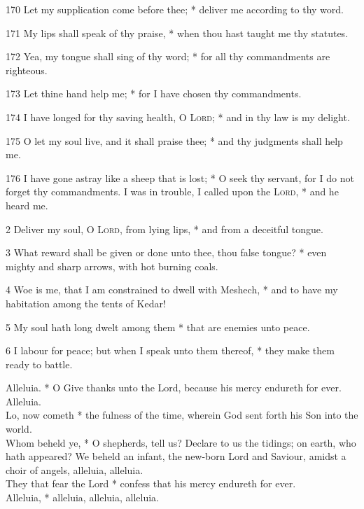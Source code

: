 \par
    170 Let my supplication come before thee; * deliver me according to thy word.
\par
    171 My lips shall speak of thy praise, * when thou hast taught me thy statutes.
\par
    172 Yea, my tongue shall sing of thy word; * for all thy commandments are righteous.
\par
    173 Let thine hand help me; * for I have chosen thy commandments.
\par
    174 I have longed for thy saving health, O \textsc{Lord}; * and in thy law is my delight.
\par
    175 O let my soul live, and it shall praise thee; * and thy judgments shall help me.
\par
    176 I have gone astray like a sheep that is lost; * O seek thy servant, for I do not forget thy commandments. 
 I was in trouble, I called upon the \textsc{Lord}, * and he heard me.
\par
    2 Deliver my soul, O \textsc{Lord}, from lying lips, * and from a deceitful tongue.
\par
    3 What reward shall be given or done unto thee, thou false tongue? * even mighty and sharp arrows, with hot burning coals.
\par
    4 Woe is me, that I am constrained to dwell with Meshech, * and to have my habitation among the tents of Kedar!
\par
    5 My soul hath long dwelt among them * that are enemies unto peace.
\par
    6 I labour for peace; but when I speak unto them thereof, * they make them ready to battle.\\
\par\noindent
{} Alleluia. * O Give thanks unto the Lord, because his mercy endureth for ever. Alleluia.\\
 Lo, now cometh * the fulness of the time, wherein God sent forth his Son into the world.\\
 Whom beheld ye, * O shepherds, tell us? Declare to us the tidings; on earth, who hath appeared? We beheld an infant, the new-born Lord and Saviour, amidst a choir of angels, alleluia, alleluia.\\
 They that fear the Lord * confess that his mercy endureth for ever.\\
 Alleluia, * alleluia, alleluia, alleluia.
